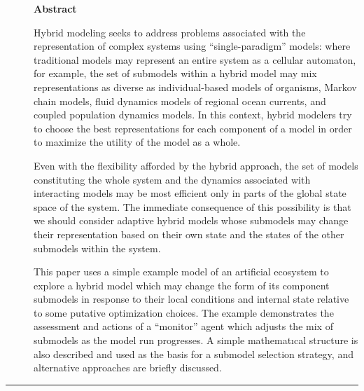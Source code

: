 \begin{description}
  \item[ ]
    \textbf{Abstract}

     Hybrid modeling seeks to address problems associated with the
     rep\-re\-sen\-ta\-tion of complex systems using ``single-paradigm'' models:
     where traditional models may represent an entire system as a
     cellular automaton, for example, the set of submodels within a hybrid
     model may mix rep\-re\-sen\-ta\-tions as diverse as in\-di\-vidu\-al-based models
     of organisms, Markov chain models, fluid dynamics models of regional
     ocean currents, and coupled population dynamics models. In this
     context, hybrid modelers try to choose the best rep\-re\-sen\-ta\-tions for
     each component of a model in order to maximize the utility of the
     model as a whole.

     Even with the flexibility afforded by the hybrid approach, the set
     of models constituting the whole system and the dynamics associated
     with interacting models may be most efficient only in parts of the
     global state space of the system.  The immediate consequence of this
     possibility is that we should consider adaptive hybrid models whose
     submodels may change their rep\-re\-sen\-ta\-tion based on their own
     state and the states of the other sub\-models within the system.

     This paper uses a simple example model of an artificial ecosystem to
     explore a hybrid model which may change the form of its component
     sub\-models in response to their local conditions and internal state
     relative to some putative optimization choices.  The example
     demonstrates the assessment and actions of a ``monitor'' agent which
     adjusts the mix of sub\-models as the model run progresses.  A simple
     math\-e\-mat\-\i\-cal structure is also described and used as the basis for a
     sub\-model selection strategy, and alternative approaches are briefly
     discussed.
\end{description}

\rule{\textwidth}{2pt}




